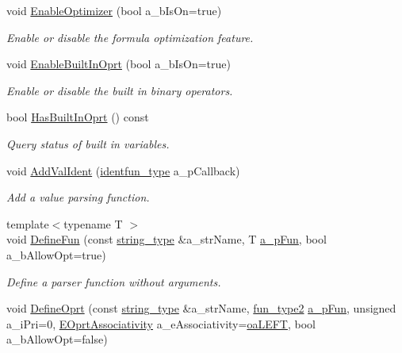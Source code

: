 \begin{DoxyCompactItemize}
void \hyperlink{classmu_1_1_parser_base_a43221e10afd17efe8d32898707763cb4}{Enable\+Optimizer} (bool a\+\_\+b\+Is\+On=true)
\begin{DoxyCompactList}\small\item\em Enable or disable the formula optimization feature. \end{DoxyCompactList}\item 
void \hyperlink{classmu_1_1_parser_base_adf5cb2ffd21f51fac2633a4976fe1e2d}{Enable\+Built\+In\+Oprt} (bool a\+\_\+b\+Is\+On=true)
\begin{DoxyCompactList}\small\item\em Enable or disable the built in binary operators. \end{DoxyCompactList}\item 
bool \hyperlink{classmu_1_1_parser_base_ab1f44f5270153cefe9595f06581ffd29}{Has\+Built\+In\+Oprt} () const 
\begin{DoxyCompactList}\small\item\em Query status of built in variables. \end{DoxyCompactList}\item 
void \hyperlink{classmu_1_1_parser_base_a0b49dbe051415f9d2a9d5564c38609e3}{Add\+Val\+Ident} (\hyperlink{namespacemu_a0e40974644c0e6488d76229ca0f4ce23}{identfun\+\_\+type} a\+\_\+p\+Callback)
\begin{DoxyCompactList}\small\item\em Add a value parsing function. \end{DoxyCompactList}\item 
{\footnotesize template$<$typename T $>$ }\\void \hyperlink{classmu_1_1_parser_base_a19bff73a29e12bb1af90793ceb258059}{Define\+Fun} (const \hyperlink{namespacemu_ae9f8b44d9a97dd397180891e8390c3e9}{string\+\_\+type} \&a\+\_\+str\+Name, T \hyperlink{mu_parser_d_l_l_8h_ab3a3ed85edf393f2b8ad69081fe538e8}{a\+\_\+p\+Fun}, bool a\+\_\+b\+Allow\+Opt=true)
\begin{DoxyCompactList}\small\item\em Define a parser function without arguments. \end{DoxyCompactList}\item 
void \hyperlink{classmu_1_1_parser_base_a70483983b78f13d37e4f28962d86af34}{Define\+Oprt} (const \hyperlink{namespacemu_ae9f8b44d9a97dd397180891e8390c3e9}{string\+\_\+type} \&a\+\_\+str\+Name, \hyperlink{namespacemu_abd9aed5816d33116d687f5becd85b38f}{fun\+\_\+type2} \hyperlink{mu_parser_d_l_l_8h_ab3a3ed85edf393f2b8ad69081fe538e8}{a\+\_\+p\+Fun}, unsigned a\+\_\+i\+Pri=0, \hyperlink{namespacemu_aff435b0c277f66041374f93a3803e1f1}{E\+Oprt\+Associativity} a\+\_\+e\+Associativity=\hyperlink{namespacemu_aff435b0c277f66041374f93a3803e1f1a4b1875076b2c85879e9596a7a98af7a6}{oa\+L\+E\+FT}, bool a\+\_\+b\+Allow\+Opt=false)

\end{DoxyCompactItemize}
